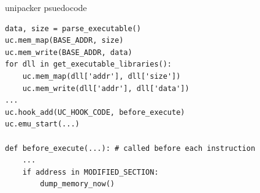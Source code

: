 \begin{frame}[fragile]{unipacker psuedocode}
\begin{Verbatim}[fontsize=\small]
data, size = parse_executable()
uc.mem_map(BASE_ADDR, size)
uc.mem_write(BASE_ADDR, data)
for dll in get_executable_libraries():
    uc.mem_map(dll['addr'], dll['size'])
    uc.mem_write(dll['addr'], dll['data'])
...
uc.hook_add(UC_HOOK_CODE, before_execute)
uc.emu_start(...)

def before_execute(...): # called before each instruction
    ...
    if address in MODIFIED_SECTION:
        dump_memory_now()
\end{Verbatim}
\end{frame}

